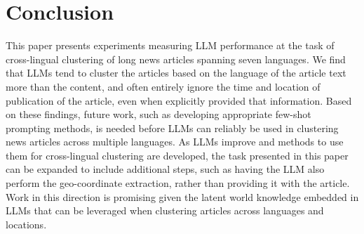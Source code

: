 \section{Conclusion}\label{section:conclusion}

This paper presents experiments measuring LLM performance at the task of cross-lingual clustering of long news articles spanning seven languages.
We find that LLMs tend to cluster the articles based on the language of the article text more than the content, and often entirely ignore the time and location of publication of the article, even when explicitly provided that information.
Based on these findings, future work, such as developing appropriate few-shot prompting methods, is needed before LLMs can reliably be used in clustering news articles across multiple languages.
As LLMs improve and methods to use them for cross-lingual clustering are developed, the task presented in this paper can be expanded to include additional steps, such as having the LLM also perform the geo-coordinate extraction, rather than providing it with the article.
Work in this direction is promising given the latent world knowledge embedded in LLMs that can be leveraged when clustering articles across languages and locations.
